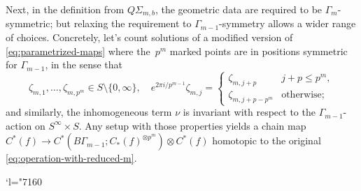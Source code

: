 \documentclass[JEP,XML,SOM,Unicode,NoFloatCountersInSection,published]{cedram}
\newcommand{\Changel}{\mathcode`l="7160}
\theoremstyle{plain}
\theoremstyle{definition}
\begin{document}
Next, in the definition from $Q\Sigma_{m,b}$, the geometric data are required to be $\Gamma_m$\nobreakdash-symmetric; but relaxing the requirement to $\Gamma_{m-1}$\nobreakdash-symmetry allows a wider range of choices. Concretely, let's count solutions of a modified version of \eqref{eq:parametrized-maps} where the~$p^m$ marked points are in positions symmetric for $\Gamma_{m-1}$, in the sense that
\begin{equation}\label{eq:zeta-symmetry}
\zeta_{m,1},\dots,\zeta_{m,p^m} \in S \setminus \{0,\infty\}, \quad e^{2\pi i/p^{m-1}}\zeta_{m,j} = \begin{cases} \zeta_{m,j+p} & j+p \leq p^m, \\ \zeta_{m,j+p-p^m} & \text{otherwise;} \end{cases}
\end{equation}
and similarly, the inhomogeneous term $\nu$ is invariant with respect to the $\Gamma_{m-1}$\nobreakdash-action on $S^\infty \times S$. Any setup with those properties yields a chain map $C^*(f) \to C^*(B\Gamma_{m-1};C_*(f)^{\otimes p^m}) \otimes C^*(f)$ homotopic to the original \eqref{eq:operation-with-reduced-m}.

\Changel
\end{document}
